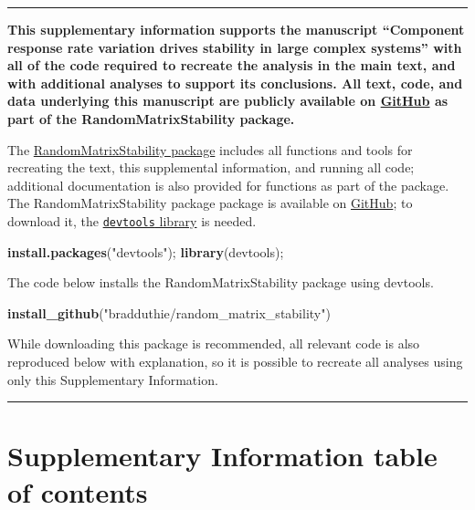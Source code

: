 \documentclass[]{article}
\newenvironment{Shaded}{\begin{snugshade}}{\end{snugshade}}
\newcommand{\KeywordTok}[1]{\textcolor[rgb]{0.13,0.29,0.53}{\textbf{{#1}}}}
\newcommand{\StringTok}[1]{\textcolor[rgb]{0.31,0.60,0.02}{{#1}}}
\newcommand{\NormalTok}[1]{{#1}}
\begin{document}
\begin{center}\rule{0.5\linewidth}{\linethickness}\end{center}

\textbf{This supplementary information supports the manuscript
``Component response rate variation drives stability in large complex
systems'' with all of the code required to recreate the analysis in the
main text, and with additional analyses to support its conclusions. All
text, code, and data underlying this manuscript are publicly available
on \href{https://github.com/bradduthie/random_matrix_stability}{GitHub}
as part of the RandomMatrixStability package.}

The
\href{https://github.com/bradduthie/random_matrix_stability}{RandomMatrixStability
package} includes all functions and tools for recreating the text, this
supplemental information, and running all code; additional documentation
is also provided for functions as part of the package. The
RandomMatrixStability package package is available on
\href{https://github.com/bradduthie/random_matrix_stability}{GitHub}; to
download it, the
\href{https://cran.r-project.org/web/packages/devtools/index.html}{\texttt{devtools}
library} is needed.

\begin{Shaded}
\begin{Highlighting}[]
\KeywordTok{install.packages}\NormalTok{(}\StringTok{"devtools"}\NormalTok{);}
\KeywordTok{library}\NormalTok{(devtools);}
\end{Highlighting}
\end{Shaded}

The code below installs the RandomMatrixStability package using
devtools.

\begin{Shaded}
\begin{Highlighting}[]
\KeywordTok{install_github}\NormalTok{(}\StringTok{"bradduthie/random_matrix_stability"}\NormalTok{)}
\end{Highlighting}
\end{Shaded}

While downloading this package is recommended, all relevant code is also
reproduced below with explanation, so it is possible to recreate all
analyses using only this Supplementary Information.

\begin{center}\rule{0.5\linewidth}{\linethickness}\end{center}

\section{Supplementary Information table of
contents}\label{supplemental-information-table-of-contents}
\end{document}
